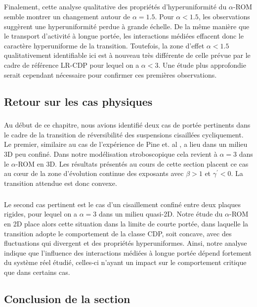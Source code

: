 \subparagraph{}Finalement, cette analyse qualitative des propriétés d'hyperuniformité du $\alpha$-ROM semble montrer un changement autour de $\alpha = 1.5$. Pour $\alpha<1.5$, les observations suggèrent une hyperuniformité perdue à grande échelle. De la même manière que le transport d'activité à longue portée, les interactions médiées effacent donc le caractère hyperuniforme de la transition. Toutefois, la zone d'effet $\alpha < 1.5$ qualitativement identifiable ici est à nouveau très différente de celle prévue par le cadre de référence LR-CDP pour lequel on a $\alpha<3$. Une étude plus approfondie serait cependant nécessaire pour confirmer ces premières observations.

\subsection{Retour sur les cas physiques}

\subparagraph{}Au début de ce chapitre, nous avions identifié deux cas de portée pertinents dans le cadre de la transition de réversibilité des suspensions cisaillées cycliquement. Le premier, similaire au cas de l'expérience de Pine et. al \cite{pine_chaos_2005}, a lieu dans un milieu 3D peu confiné. Dans notre modélisation stroboscopique cela revient à $\alpha = 3$ dans le $\alpha$-ROM en 3D. Les résultats présentés au cours de cette section placent ce cas au cœur de la zone d'évolution continue des exposants avec $\beta > 1$ et $\gamma^\prime < 0$. La transition attendue est donc convexe.

\subparagraph{}Le second cas pertinent est le cas d'un cisaillement confiné entre deux plaques rigides, pour lequel on a $\alpha = 3$ dans un milieu quasi-2D. Notre étude du $\alpha$-ROM en 2D place alors cette situation dans la limite de courte portée, dans laquelle la transition adopte le comportement de la classe CDP, soit concave, avec des fluctuations qui divergent et des propriétés hyperuniformes. Ainsi, notre analyse indique que l'influence des interactions médiées à longue portée dépend fortement du système réel étudié, celles-ci n'ayant un impact sur le comportement critique que dans certains cas.

\subsection*{Conclusion de la section}


